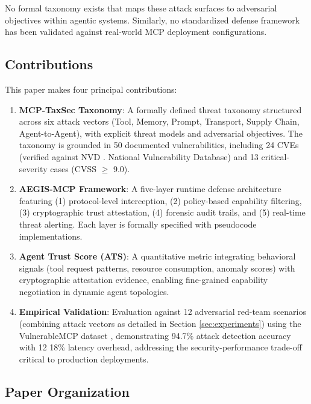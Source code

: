 \documentclass[12pt,twocolumn,journal]{IEEEtran}
\begin{document}
No formal taxonomy exists that maps these attack surfaces to adversarial objectives within agentic systems. Similarly, no standardized defense framework has been validated against real-world MCP deployment configurations.

\subsection{Contributions}

This paper makes four principal contributions:

\begin{enumerate}
\item[\textbf{C1}] \textbf{MCP-TaxSec Taxonomy}: A formally defined threat taxonomy structured across six attack vectors (Tool, Memory, Prompt, Transport, Supply Chain, Agent-to-Agent), with explicit threat models and adversarial objectives. The taxonomy is grounded in 50 documented vulnerabilities, including 24 CVEs (verified against NVD \cite{NVD2025} . National Vulnerability Database) and 13 critical-severity cases (CVSS $\geq$ 9.0).

\item[\textbf{C2}] \textbf{AEGIS-MCP Framework}: A five-layer runtime defense architecture featuring (1) protocol-level interception, (2) policy-based capability filtering, (3) cryptographic trust attestation, (4) forensic audit trails, and (5) real-time threat alerting. Each layer is formally specified with pseudocode implementations.

\item[\textbf{C3}] \textbf{Agent Trust Score (ATS)}: A quantitative metric integrating behavioral signals (tool request patterns, resource consumption, anomaly scores) with cryptographic attestation evidence, enabling fine-grained capability negotiation in dynamic agent topologies.

\item[\textbf{C4}] \textbf{Empirical Validation}: Evaluation against 12 adversarial red-team scenarios (combining attack vectors as detailed in Section \ref{sec:experiments}) using the VulnerableMCP dataset \cite{VulnerableMCP}, demonstrating 94.7\% attack detection accuracy with 12 18\% latency overhead, addressing the security-performance trade-off critical to production deployments.
\end{enumerate}

\subsection{Paper Organization}
\end{document}
